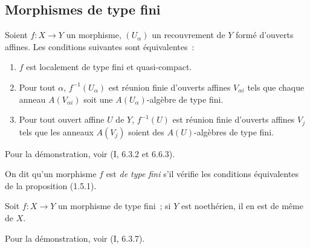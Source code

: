 \subsection{Morphismes de type fini}
\label{subsection:IV.1.5-fr}

\begin{proposition}[1.5.1]
\label{IV.1.5.1-fr}
Soient $f:X\to Y$ un morphisme, $(U_\alpha)$ un recouvrement de $Y$ formé
d'ouverts affines. Les conditions suivantes sont équivalentes~:
\begin{enumerate}
  \item[a)] $f$ est localement de type fini et quasi-compact.
  \item[b)] Pour tout $\alpha$, $f^{-1}(U_\alpha)$ est réunion finie d'ouverts
  affines $V_{\alpha i}$ tels que chaque anneau $A(V_{\alpha i})$ soit une
  $A(U_\alpha)$-algèbre de type fini.
  \item[c)] Pour tout ouvert affine $U$ de $Y$, $f^{-1}(U)$ est réunion finie
  d'ouverts affines $V_j$ tels que les anneaux $A(V_j)$ soient des
  $A(U)$-algèbres de type fini.
\end{enumerate}
\end{proposition}

Pour la démonstration, voir (I, 6.3.2 et 6.6.3).

\begin{definition}[1.5.2]
\label{IV.1.5.2-fr}
On dit qu'un morphisme $f$ est \emph{de type fini} s'il vérifie les conditions
équivalentes de la proposition (1.5.1).
\end{definition}


\begin{proposition}[1.5.3]
\label{IV.1.5.3-fr}
Soit $f:X\to Y$ un morphisme de type fini~; si $Y$ est noethérien, il en est
de même de $X$.
\end{proposition}

Pour la démonstration, voir (I, 6.3.7).

